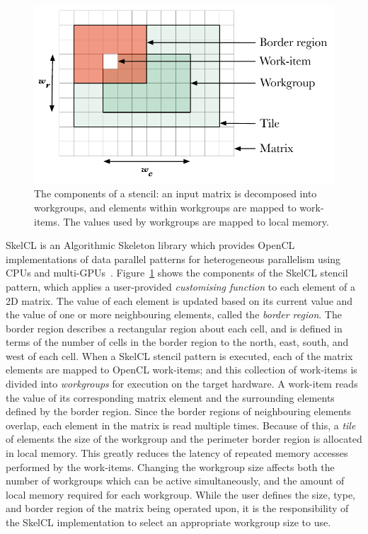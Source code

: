 \documentclass{acaces}
\begin{document}
\begin{figure}
\includegraphics[width=.38\textwidth]{stencil}
\caption[Stencil border region]{%
  The components of a stencil: an input matrix is decomposed into
  workgroups, and elements within workgroups are mapped to work-items.
  The values used by workgroups are mapped to local memory.%
  \vspace{-.75em} }
\label{fig:stencil-shape}
\end{figure}

SkelCL is an Algorithmic Skeleton library which provides OpenCL
implementations of data parallel patterns for heterogeneous
parallelism using CPUs and
multi-GPUs~\cite{Steuwer2011}. Figure~\ref{fig:stencil-shape} shows
the components of the SkelCL stencil pattern, which applies a
user-provided \emph{customising function} to each element of a 2D
matrix. The value of each element is updated based on its current
value and the value of one or more neighbouring elements, called the
\emph{border region}. The border region describes a rectangular region
about each cell, and is defined in terms of the number of cells in the
border region to the north, east, south, and west of each cell. When a
SkelCL stencil pattern is executed, each of the matrix elements are
mapped to OpenCL work-items; and this collection of work-items is
divided into \emph{workgroups} for execution on the target hardware. A
work-item reads the value of its corresponding matrix element and the
surrounding elements defined by the border region. Since the border
regions of neighbouring elements overlap, each element in the matrix
is read multiple times. Because of this, a \emph{tile} of elements the
size of the workgroup and the perimeter border region is allocated in
local memory. This greatly reduces the latency of repeated memory
accesses performed by the work-items. Changing the workgroup size
affects both the number of workgroups which can be active
simultaneously, and the amount of local memory required for each
workgroup. While the user defines the size, type, and border region of
the matrix being operated upon, it is the responsibility of the SkelCL
implementation to select an appropriate workgroup size to use.
\end{document}

